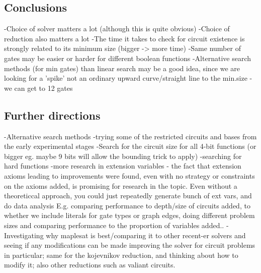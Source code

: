 \documentclass{article}
\begin{document}
\subsection{Conclusions}

-Choice of solver matters a lot (although this is quite obvious)
-Choice of reduction also matters a lot
-The time it takes to check for circuit existence is strongly related to its minimum size  (bigger -> more time)
-Same number of gates may be easier or harder for different boolean functions
-Alternative search methods (for min gates) than linear search may be a good idea, since we are looking for a 'spike' not an ordinary upward curve/straight line to the min.size
-we can get to 12 gates 

\subsection{Further directions}

-Alternative search methods 
-trying some of the restricted circuits and bases from the early experimental stages
-Search for the circuit size for all 4-bit functions (or bigger eg. maybe 9 bits will allow the bounding trick to apply)
-searching for hard functions 
-more research in extension variables - the fact that extension axioms leading to improvements were found, even with no strategy or constraints on the axioms added, is promising for research in the topic. Even without a theoreticcal approach, you could just repeatedly generate bunch of ext vars, and do data analysis E.g. comparing performance to depth/size of circuits added, to whether we include literals for gate types or graph edges, doing different problem sizes and comparing performance to the proportion of variables added..
-Investigating why maplesat is best/comparing it to other recent-er solvers and seeing if any modifications can be made improving the solver for circuit problems in particular; same for the kojevnikov reduction, and thinking about how to modify it; also other reductions such as valiant circuits.

 

\end{document}
